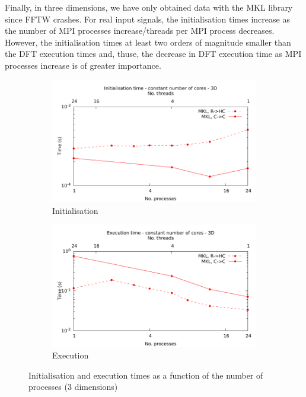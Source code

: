 \documentclass[12pt, a4paper]{article} \setlength{\textheight}{24cm}
\begin{document}
Finally, in three dimensions, we have only obtained data with the MKL
library since FFTW crashes. For real input signals, the initialisation
times increase as the number of MPI processes increase/threads per MPI
process decreases. However, the initialisation times at least two
orders of magnitude smaller than the DFT execution times and, thuse,
the decrease in DFT execution time as MPI processes increase is of
greater importance.
\begin{figure}[H]
  \centering
  \begin{subfigure}{.5\textwidth}
    \centering
    \includegraphics[width=.9\linewidth]{graphs/const-init-3d.pdf}
    \caption{Initialisation}
    \label{3DCONSTI}
  \end{subfigure}%
  \begin{subfigure}{.5\textwidth}
    \centering
    \includegraphics[width=.9\linewidth]{graphs/const-exec-3d.pdf}
    \caption{Execution}
    \label{3DCONSTE}
  \end{subfigure}
  \caption{Initialisation and execution times as a function of the
    number of processes (3 dimensions)}
  \label{3DCONST}
\end{figure}
\end{document}
